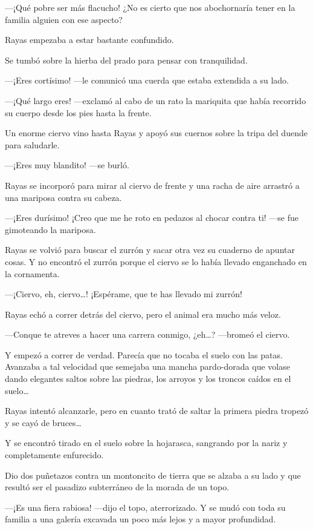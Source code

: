 \documentclass{barcodevapor3pags}
\begin{document}
---¡Qué pobre ser más flacucho! ¿No es cierto que nos abochornaría tener
en la familia alguien con ese aspecto?

Rayas empezaba a estar bastante confundido.

Se tumbó sobre la hierba del prado para pensar con tranquilidad.

---¡Eres cortísimo! ---le comunicó una cuerda que estaba extendida a su
lado.

---¡Qué largo eres! ---exclamó al cabo de un rato la mariquita que había
recorrido su cuerpo desde los pies hasta la frente.

Un enorme ciervo vino hasta Rayas y apoyó sus cuernos sobre la tripa del
duende para saludarle.

---¡Eres muy blandito! ---se burló.

Rayas se incorporó para mirar al ciervo de frente y una racha de aire
arrastró a una mariposa contra su cabeza.

---¡Eres durísimo! ¡Creo que me he roto en pedazos al chocar contra ti!
---se fue gimoteando la mariposa.

Rayas se volvió para buscar el zurrón y sacar otra vez su cuaderno de
apuntar cosas. Y no encontró el zurrón porque el ciervo se lo había
llevado enganchado en la cornamenta.

---¡Ciervo, eh, ciervo\ldots! ¡Espérame, que te has llevado mi zurrón!

Rayas echó a correr detrás del ciervo, pero el animal era mucho más
veloz.

---Conque te atreves a hacer una carrera conmigo, ¿eh\ldots? ---bromeó
el ciervo.

Y empezó a correr de verdad. Parecía que no tocaba el suelo con las
patas. Avanzaba a tal velocidad que semejaba una mancha pardo-dorada que
volase dando elegantes saltos sobre las piedras, los arroyos y los
troncos caídos en el suelo\ldots{}

Rayas intentó alcanzarle, pero en cuanto trató de saltar la primera
piedra tropezó y se cayó de bruces\ldots{}

Y se encontró tirado en el suelo sobre la hojarasca, sangrando por la
nariz y completamente enfurecido.

Dio dos puñetazos contra un montoncito de tierra que se alzaba a su lado
y que resultó ser el pasadizo subterráneo de la morada de un topo.

---¡Es una fiera rabiosa! ---dijo el topo, aterrorizado. Y se mudó con
toda su familia a una galería excavada un poco más lejos y a mayor
profundidad.
\end{document}
